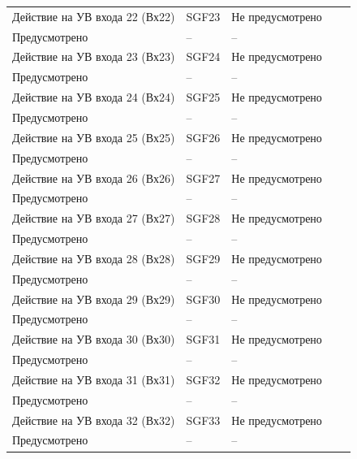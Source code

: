 \begin{longtable}{|>{\centering\arraybackslash}m{5.3cm}|>{\centering\arraybackslash}m{3.3cm}|>{\centering\arraybackslash}m{4.2cm}|>{\centering\arraybackslash}m{1.8cm}|>{\centering\arraybackslash}m{1cm}|}
\hline
\centering Действие на УВ входа 22 (Вх22)  & \centering SGF23 & \centering Не предусмотрено \\ Предусмотрено & \centering -- & \centering \arraybackslash -- \\
\hline
\centering Действие на УВ входа 23 (Вх23)  & \centering SGF24 & \centering Не предусмотрено \\ Предусмотрено & \centering -- & \centering \arraybackslash -- \\
\hline
\centering Действие на УВ входа 24 (Вх24)  & \centering SGF25 & \centering Не предусмотрено \\ Предусмотрено & \centering -- & \centering \arraybackslash -- \\
\hline
\centering Действие на УВ входа 25 (Вх25)  & \centering SGF26 & \centering Не предусмотрено \\ Предусмотрено & \centering -- & \centering \arraybackslash -- \\
\hline
\centering Действие на УВ входа 26 (Вх26)  & \centering SGF27 & \centering Не предусмотрено \\ Предусмотрено & \centering -- & \centering \arraybackslash -- \\
\hline
\centering Действие на УВ входа 27 (Вх27)  & \centering SGF28 & \centering Не предусмотрено \\ Предусмотрено & \centering -- & \centering \arraybackslash -- \\
\hline
\centering Действие на УВ входа 28 (Вх28)  & \centering SGF29 & \centering Не предусмотрено \\ Предусмотрено & \centering -- & \centering \arraybackslash -- \\
\hline
\centering Действие на УВ входа 29 (Вх29)  & \centering SGF30 & \centering Не предусмотрено \\ Предусмотрено & \centering -- & \centering \arraybackslash -- \\
\hline
\centering Действие на УВ входа 30 (Вх30)  & \centering SGF31 & \centering Не предусмотрено \\ Предусмотрено & \centering -- & \centering \arraybackslash -- \\
\hline
\centering Действие на УВ входа 31 (Вх31)  & \centering SGF32 & \centering Не предусмотрено \\ Предусмотрено & \centering -- & \centering \arraybackslash -- \\
\hline
\centering Действие на УВ входа 32 (Вх32)  & \centering SGF33 & \centering Не предусмотрено \\ Предусмотрено & \centering -- & \centering \arraybackslash -- \\

\end{longtable}
